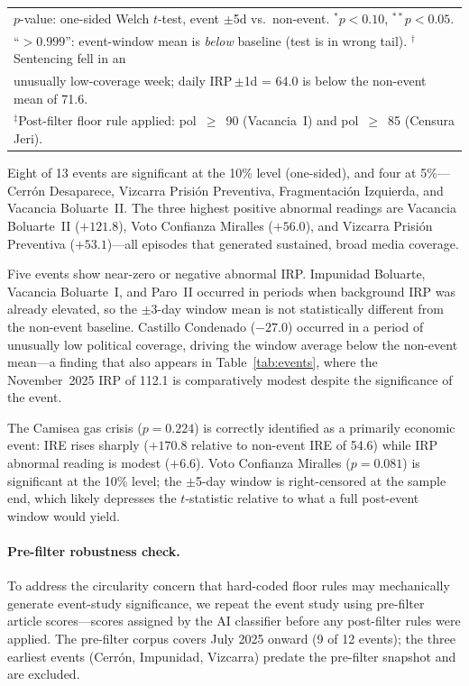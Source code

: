 \documentclass[12pt,a4paper]{article}
\begin{document}
\begin{table}[h!]
\begin{tabular}{lrrrrrr}
\multicolumn{7}{l}{\footnotesize $p$-value: one-sided Welch $t$-test, event $\pm$5d vs.\ non-event. $^{*}p<0.10$, $^{**}p<0.05$.} \\
\multicolumn{7}{l}{\footnotesize ``$>0.999$'': event-window mean is \emph{below} baseline (test is in wrong tail). $^\dagger$Sentencing fell in an} \\
\multicolumn{7}{l}{\footnotesize unusually low-coverage week; daily IRP\,$\pm$1d = 64.0 is below the non-event mean of 71.6.} \\
\multicolumn{7}{l}{\footnotesize $^\ddagger$Post-filter floor rule applied: pol~$\geq$~90 (Vacancia~I) and pol~$\geq$~85 (Censura Jeri).}
\end{tabular}
\end{table}

Eight of 13 events are significant at the 10\% level (one-sided), and four at
5\%---Cerr\'on Desaparece, Vizcarra Prisi\'on Preventiva, Fragmentaci\'on
Izquierda, and Vacancia Boluarte~II.  The three highest positive abnormal
readings are Vacancia Boluarte~II ($+121.8$), Voto Confianza Miralles
($+56.0$), and Vizcarra Prisi\'on Preventiva ($+53.1$)---all episodes
that generated sustained, broad media coverage.

Five events show near-zero or negative abnormal IRP.  Impunidad Boluarte,
Vacancia Boluarte~I, and Paro~II occurred in periods when background IRP
was already elevated, so the $\pm$3-day window mean is not statistically
different from the non-event baseline.  Castillo Condenado ($-27.0$)
occurred in a period of unusually low political coverage, driving the
window average below the non-event mean---a finding that also appears in
Table~\ref{tab:events}, where the November~2025 IRP of 112.1 is
comparatively modest despite the significance of the event.

The Camisea gas crisis ($p = 0.224$) is correctly identified as a primarily
economic event: IRE rises sharply ($+170.8$ relative to non-event IRE of
54.6) while IRP abnormal reading is modest ($+6.6$).  Voto Confianza
Miralles ($p = 0.081$) is significant at the 10\% level; the $\pm$5-day
window is right-censored at the sample end, which likely depresses the
$t$-statistic relative to what a full post-event window would yield.

\paragraph{Pre-filter robustness check.}
To address the circularity concern that hard-coded floor rules may mechanically
generate event-study significance, we repeat the event study using pre-filter
article scores---scores assigned by the AI classifier before any post-filter
rules were applied.  The pre-filter corpus covers July 2025 onward (9 of 12
events); the three earliest events (Cerr\'on, Impunidad, Vizcarra) predate
the pre-filter snapshot and are excluded.
\end{document}
